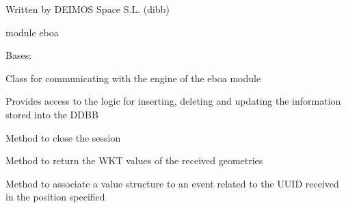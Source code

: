Written by DEIMOS Space S.L. (dibb)

module eboa

\begin{fulllineitems}
\label{\detokenize{eboa.engine:eboa.engine.engine.Engine}}
Bases: 

Class for communicating with the engine of the eboa module

Provides access to the logic for inserting, deleting and updating
the information stored into the DDBB

\begin{fulllineitems}
\label{\detokenize{eboa.engine:eboa.engine.engine.Engine.close_session}}
Method to close the session

\end{fulllineitems}


\begin{fulllineitems}
\label{\detokenize{eboa.engine:eboa.engine.engine.Engine.geometries_to_wkt}}
Method to return the WKT values of the received geometries

\end{fulllineitems}


\begin{fulllineitems}
\label{\detokenize{eboa.engine:eboa.engine.engine.Engine.insert_event_value}}
Method to associate a value structure to an event related to the UUID received in the position specified


\end{fulllineitems}
\end{fulllineitems}
